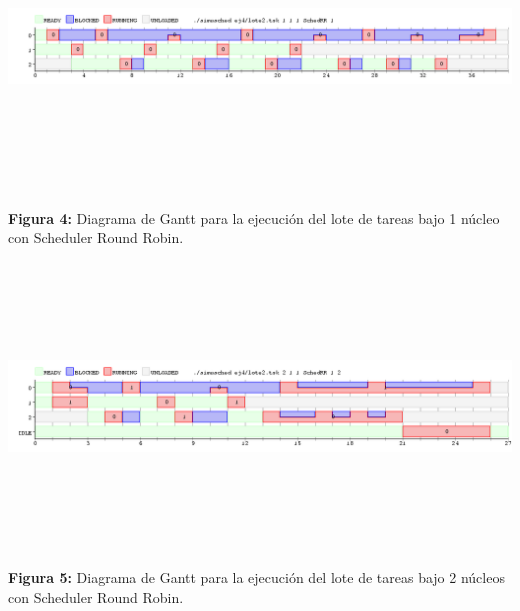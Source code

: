 \documentclass[a4paper]{article}
\begin{document}
 \includegraphics[width=\textwidth,height=3.0in,keepaspectratio]{imagenes/ej4/1core.png} \newline
\begin {flushleft}
\textbf{Figura 4:} Diagrama de Gantt para la ejecuci\'on del lote de tareas bajo 1 n\'ucleo con Scheduler Round Robin.
\end{flushleft}

  \includegraphics[width=\textwidth,height=3.0in,keepaspectratio]{imagenes/ej4/2core.png} \newline
\begin {flushleft}
\textbf{Figura 5:} Diagrama de Gantt para la ejecuci\'on del lote de tareas bajo 2 n\'ucleos con Scheduler Round Robin.
\end{flushleft}
\end{document}
